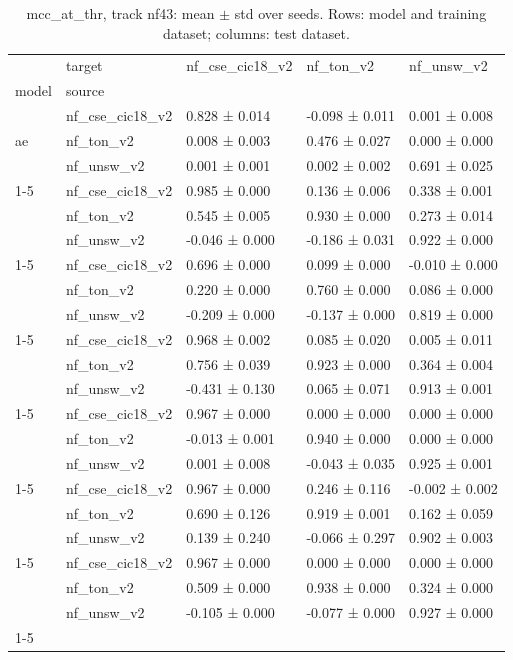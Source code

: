 \begin{table}
\caption{mcc_at_thr, track nf43: mean $\pm$ std over seeds. Rows: model and training dataset; columns: test dataset.}
\label{tab:matrix_nf43_mcc_at_thr}
\begin{tabular}{lllll}
\toprule
 & target & nf_cse_cic18_v2 & nf_ton_v2 & nf_unsw_v2 \\
model & source &  &  &  \\
\midrule
\multirow[t]{3}{*}{ae} & nf_cse_cic18_v2 & 0.828 ± 0.014 & -0.098 ± 0.011 & 0.001 ± 0.008 \\
 & nf_ton_v2 & 0.008 ± 0.003 & 0.476 ± 0.027 & 0.000 ± 0.000 \\
 & nf_unsw_v2 & 0.001 ± 0.001 & 0.002 ± 0.002 & 0.691 ± 0.025 \\
\cline{1-5}
\multirow[t]{3}{*}{dt} & nf_cse_cic18_v2 & 0.985 ± 0.000 & 0.136 ± 0.006 & 0.338 ± 0.001 \\
 & nf_ton_v2 & 0.545 ± 0.005 & 0.930 ± 0.000 & 0.273 ± 0.014 \\
 & nf_unsw_v2 & -0.046 ± 0.000 & -0.186 ± 0.031 & 0.922 ± 0.000 \\
\cline{1-5}
\multirow[t]{3}{*}{lda} & nf_cse_cic18_v2 & 0.696 ± 0.000 & 0.099 ± 0.000 & -0.010 ± 0.000 \\
 & nf_ton_v2 & 0.220 ± 0.000 & 0.760 ± 0.000 & 0.086 ± 0.000 \\
 & nf_unsw_v2 & -0.209 ± 0.000 & -0.137 ± 0.000 & 0.819 ± 0.000 \\
\cline{1-5}
\multirow[t]{3}{*}{mlp} & nf_cse_cic18_v2 & 0.968 ± 0.002 & 0.085 ± 0.020 & 0.005 ± 0.011 \\
 & nf_ton_v2 & 0.756 ± 0.039 & 0.923 ± 0.000 & 0.364 ± 0.004 \\
 & nf_unsw_v2 & -0.431 ± 0.130 & 0.065 ± 0.071 & 0.913 ± 0.001 \\
\cline{1-5}
\multirow[t]{3}{*}{rf} & nf_cse_cic18_v2 & 0.967 ± 0.000 & 0.000 ± 0.000 & 0.000 ± 0.000 \\
 & nf_ton_v2 & -0.013 ± 0.001 & 0.940 ± 0.000 & 0.000 ± 0.000 \\
 & nf_unsw_v2 & 0.001 ± 0.008 & -0.043 ± 0.035 & 0.925 ± 0.001 \\
\cline{1-5}
\multirow[t]{3}{*}{tabnet} & nf_cse_cic18_v2 & 0.967 ± 0.000 & 0.246 ± 0.116 & -0.002 ± 0.002 \\
 & nf_ton_v2 & 0.690 ± 0.126 & 0.919 ± 0.001 & 0.162 ± 0.059 \\
 & nf_unsw_v2 & 0.139 ± 0.240 & -0.066 ± 0.297 & 0.902 ± 0.003 \\
\cline{1-5}
\multirow[t]{3}{*}{xgb} & nf_cse_cic18_v2 & 0.967 ± 0.000 & 0.000 ± 0.000 & 0.000 ± 0.000 \\
 & nf_ton_v2 & 0.509 ± 0.000 & 0.938 ± 0.000 & 0.324 ± 0.000 \\
 & nf_unsw_v2 & -0.105 ± 0.000 & -0.077 ± 0.000 & 0.927 ± 0.000 \\
\cline{1-5}
\bottomrule
\end{tabular}
\end{table}
